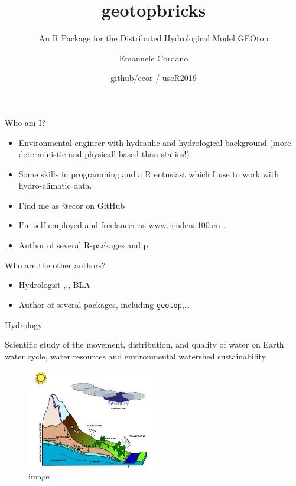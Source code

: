 \documentclass[ignorenonframetext,]{beamer}
\title{geotopbricks}
\subtitle{An R Package for the Distributed Hydrological Model GEOtop}
\author{Emanuele Cordano}
\date{github/ecor / useR2019}
\providecommand{\tightlist}{%
  \setlength{\itemsep}{0pt}\setlength{\parskip}{0pt}}
\begin{document}
\frame{\titlepage}

\begin{frame}{Who am I?}
\protect\hypertarget{who-am-i}{}

\begin{itemize}
\tightlist
\item
  Environmental engineer with hydraulic and hydrological background
  (more deterministic and physicall-based than statics!)
\item
  Some skills in programming and a R entusiast which I use to work with
  hydro-climatic data.
\item
  Find me as @ecor on GitHub
\item
  I'm self-employed and freelancer as www.rendena100.eu .\\
\item
  Author of several R-packages and p
\end{itemize}

\end{frame}

\begin{frame}[fragile]{Who are the other authors?}
\protect\hypertarget{who-are-the-other-authors}{}

\begin{itemize}
\tightlist
\item
  Hydrologist ,,, BLA
\item
  Author of several packages, including \texttt{geotop},\ldots{}
\end{itemize}

\end{frame}

\begin{frame}{Hydrology}
\protect\hypertarget{hydrology}{}

Scientific study of the movement, distribution, and quality of water on
Earth water cycle, water resources and environmental watershed
sustainability.

\begin{figure}
\centering
\includegraphics[width=0.5\textwidth,height=\textheight]{resources/images/geotop_landscape.png}
\caption{image}
\end{figure}

\end{frame}
\end{document}
